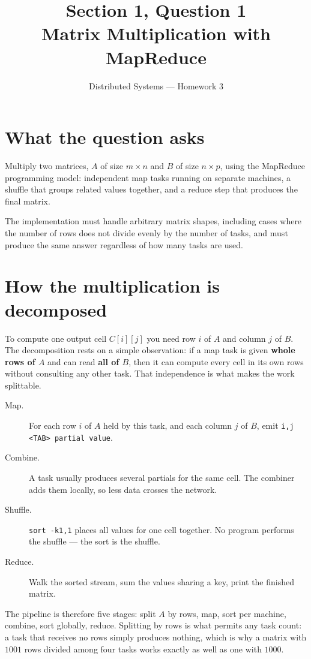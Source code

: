 \documentclass[11pt,a4paper]{article}
\title{\textbf{Section 1, Question 1}\\[0.3em]
       \large Matrix Multiplication with MapReduce}
\author{Distributed Systems --- Homework 3}
\date{}
\begin{document}
\maketitle
\vspace{-2.5em}

\section{What the question asks}

Multiply two matrices, $A$ of size $m \times n$ and $B$ of size $n \times p$,
using the MapReduce programming model: independent map tasks running on separate
machines, a shuffle that groups related values together, and a reduce step that
produces the final matrix.

The implementation must handle arbitrary matrix shapes, including cases where
the number of rows does not divide evenly by the number of tasks, and must
produce the same answer regardless of how many tasks are used.

\section{How the multiplication is decomposed}

To compute one output cell $C[i][j]$ you need row $i$ of $A$ and column $j$ of
$B$. The decomposition rests on a simple observation: if a map task is given
\textbf{whole rows of $A$} and can read \textbf{all of $B$}, then it can compute
every cell in its own rows without consulting any other task. That independence
is what makes the work splittable.

\begin{description}
\item[Map.] For each row $i$ of $A$ held by this task, and each column $j$ of
  $B$, emit \texttt{i,j <TAB> partial value}.
\item[Combine.] A task usually produces several partials for the same cell. The
  combiner adds them locally, so less data crosses the network.
\item[Shuffle.] \texttt{sort -k1,1} places all values for one cell together. No
  program performs the shuffle --- the sort is the shuffle.
\item[Reduce.] Walk the sorted stream, sum the values sharing a key, print the
  finished matrix.
\end{description}

The pipeline is therefore five stages: split $A$ by rows, map, sort per machine,
combine, sort globally, reduce. Splitting by rows is what permits any task
count: a task that receives no rows simply produces nothing, which is why a
matrix with $1001$ rows divided among four tasks works exactly as well as one
with $1000$.
\end{document}
